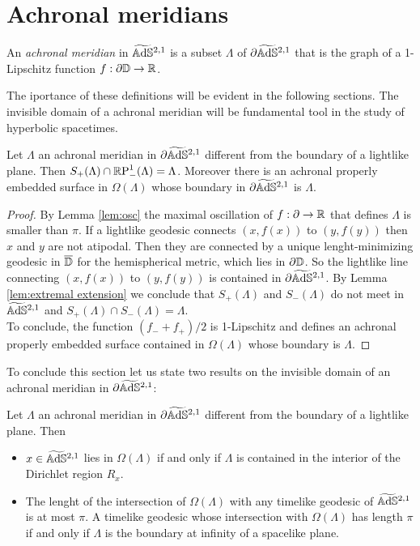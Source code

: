 \section{Achronal meridians}
\begin{definition}
    An \textit{achronal meridian} in $\AS^{2,1}$ is a subset $\Lambda$ of $\partial\AS^{2,1}$ that is the graph of a 1-Lipschitz function $f: \partial\D\to\R$.
\end{definition}
The iportance of these definitions will be evident in the following sections.
The invisible domain of a achronal meridian will be fundamental tool in the study of hyperbolic spacetimes.
\begin{lemma}
    Let $\Lambda$ an achronal meridian in $\partial\AS^{2,1}$ different from the boundary of a lightlike plane. Then $S_+(\Lambda) \cap \S_-(\Lambda)=\Lambda$. Moreover there is an achronal properly embedded surface in $\Omega(\Lambda)$ whose boundary in $\partial\AS^{2,1}$ is $\Lambda$.
\end{lemma}
\begin{proof}
    By Lemma \ref{lem:osc} the maximal oscillation of $f:\partial \to \R$ that defines $\Lambda$ is smaller than $\pi$. If a lightlike geodesic connects $(x,f(x))$ to $(y,f(y))$ then $x$ and $y$ are not atipodal. Then they are connected by a unique lenght-minimizing geodesic in $\overline{\D}$ for the hemispherical metric, which lies in $\partial\D$. So the lightlike line connecting $(x,f(x))$ to $(y,f(y))$ is contained in $\partial\AS^{2,1}$. By Lemma \ref{lem:extremal extension} we conclude that $S_+(\Lambda)$ and $S_-(\Lambda)$ do not meet in $\AS^{2,1}$ and $S_+(\Lambda)\cap S_-(\Lambda)=\Lambda$.\\
    To conclude, the function $(f_- + f_+) /2$ is 1-Lipschitz and defines an achronal properly embedded surface contained in $\Omega(\Lambda)$ whose boundary is $\Lambda$.
\end{proof}
To conclude this section let us state two results on the invisible domain of an achronal meridian in $\partial\AS^{2,1}$:
\begin{proposition}
    Let $\Lambda$ an achronal meridian in $\partial\AS^{2,1}$ different from the boundary of a lightlike plane. Then
    \begin{itemize}
        \item $x \in \AS^{2,1}$ lies in $\Omega(\Lambda)$ if and only if $\Lambda$ is contained in the interior of the Dirichlet region $R_x$.
        \item The lenght of the intersection of $\Omega(\Lambda)$ with any timelike geodesic of $\AS^{2,1}$ is at most $\pi$. A timelike geodesic whose intersection with $\Omega(\Lambda)$ has length $\pi$ if and only if $\Lambda$ is the boundary at infinity of a spacelike plane.
    \end{itemize}
\end{proposition}
